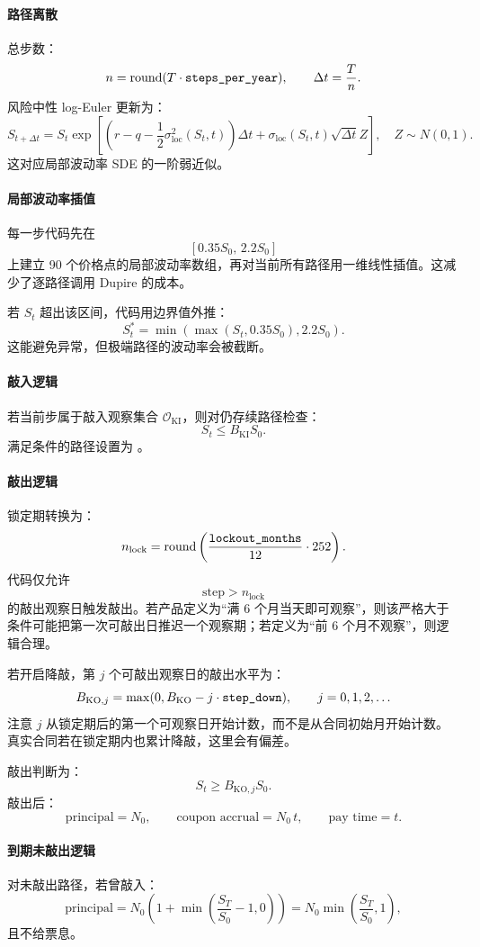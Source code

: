 \documentclass[UTF8,a4paper,11pt]{ctexart}
\newcommand{\code}[1]{\texttt{\detokenize{#1}}}
\begin{document}
\paragraph{路径离散}
总步数：
\[
n=\mathrm{round}(T\cdot \code{steps_per_year}),
\qquad
\Delta t=\frac{T}{n}.
\]
风险中性 log-Euler 更新为：
\[
S_{t+\Delta t}
=
S_t\exp\left[
\left(r-q-\frac12\sigma_{\mathrm{loc}}^2(S_t,t)\right)\Delta t
+\sigma_{\mathrm{loc}}(S_t,t)\sqrt{\Delta t}Z
\right],
\quad Z\sim N(0,1).
\]
这对应局部波动率 SDE 的一阶弱近似。

\paragraph{局部波动率插值}
每一步代码先在
\[
[0.35S_0,\,2.2S_0]
\]
上建立 90 个价格点的局部波动率数组，再对当前所有路径用一维线性插值。这减少了逐路径调用 Dupire 的成本。

若 \(S_t\) 超出该区间，代码用边界值外推：
\[
S_t^{\ast}=\min(\max(S_t,0.35S_0),2.2S_0).
\]
这能避免异常，但极端路径的波动率会被截断。

\paragraph{敲入逻辑}
若当前步属于敲入观察集合 \(\mathcal O_{\mathrm{KI}}\)，则对仍存续路径检查：
\[
S_t\le B_{\mathrm{KI}}S_0.
\]
满足条件的路径设置为 \code{knocked_in=True}。

\paragraph{敲出逻辑}
锁定期转换为：
\[
n_{\mathrm{lock}}
=
\mathrm{round}\left(
\frac{\code{lockout_months}}{12}\cdot 252
\right).
\]
代码仅允许
\[
\text{step}>n_{\mathrm{lock}}
\]
的敲出观察日触发敲出。若产品定义为“满 6 个月当天即可观察”，则该严格大于条件可能把第一次可敲出日推迟一个观察期；若定义为“前 6 个月不观察”，则逻辑合理。

若开启降敲，第 \(j\) 个可敲出观察日的敲出水平为：
\[
B_{\mathrm{KO},j}
=
\max(0,B_{\mathrm{KO}}-j\cdot \code{step_down}),
\qquad j=0,1,2,\ldots
\]
注意 \(j\) 从锁定期后的第一个可观察日开始计数，而不是从合同初始月开始计数。真实合同若在锁定期内也累计降敲，这里会有偏差。

敲出判断为：
\[
S_t\ge B_{\mathrm{KO},j}S_0.
\]
敲出后：
\[
\text{principal}=N_0,\qquad
\text{coupon accrual}=N_0\,t,\qquad
\text{pay time}=t.
\]

\paragraph{到期未敲出逻辑}
对未敲出路径，若曾敲入：
\[
\text{principal}
=
N_0\left(1+\min\left(\frac{S_T}{S_0}-1,0\right)\right)
=
N_0\min\left(\frac{S_T}{S_0},1\right),
\]
且不给票息。
\end{document}
